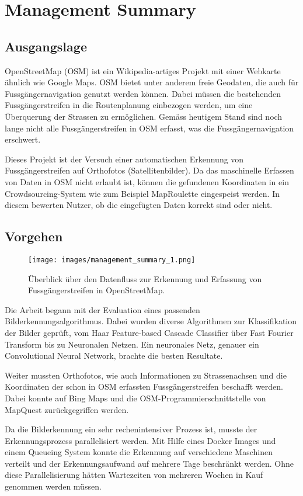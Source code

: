 \section{Management Summary}
\subsection*{Ausgangslage}
OpenStreetMap (OSM) ist ein Wikipedia-artiges Projekt mit einer Webkarte ähnlich wie Google Maps. OSM bietet unter anderem freie Geodaten, die auch für Fussgängernavigation genutzt werden können. Dabei müssen die bestehenden Fussgängerstreifen in die Routenplanung einbezogen werden, um eine Überquerung der Strassen zu ermöglichen. Gemäss heutigem Stand sind noch lange nicht alle Fussgängerstreifen in OSM erfasst, was die Fussgängernavigation erschwert.

Dieses Projekt ist der Versuch einer automatischen Erkennung von Fussgängerstreifen auf Orthofotos (Satellitenbilder). Da das maschinelle Erfassen von Daten in OSM nicht erlaubt ist, können die gefundenen Koordinaten in ein Crowdsourcing-System wie zum Beispiel MapRoulette eingespeist werden. In diesem bewerten Nutzer, ob die eingefügten Daten korrekt sind oder nicht.

\subsection*{Vorgehen}
\begin{figure}[H]
	\centering
	\texttt{[image: images/management\_summary\_1.png]}
	\caption[Management Summery Überblick]{Überblick über den Datenfluss zur Erkennung und Erfassung von Fussgängerstreifen in OpenStreetMap.}
\end{figure}
\medskip
Die Arbeit begann mit der Evaluation eines passenden Bilderkennungsalgorithmus. Dabei wurden diverse Algorithmen zur Klassifikation der Bilder geprüft, vom Haar Feature-based Cascade Classifier über Fast Fourier Transform bis zu Neuronalen Netzen. Ein neuronales Netz, genauer ein Convolutional Neural Network, brachte die besten Resultate.

Weiter mussten Orthofotos, wie auch Informationen zu Strassenachsen und die Koordinaten der schon in OSM erfassten Fussgängerstreifen beschafft werden. Dabei konnte auf Bing Maps und die OSM-Programmierschnittstelle von MapQuest zurückgegriffen werden.

Da die Bilderkennung ein sehr rechenintensiver Prozess ist, musste der Erkennungsprozess parallelisiert werden. Mit Hilfe eines Docker Images und einem Queueing System konnte die Erkennung auf verschiedene Maschinen verteilt und der Erkennungsaufwand auf mehrere Tage beschränkt werden. Ohne diese Parallelisierung hätten Wartezeiten von mehreren Wochen in Kauf genommen werden müssen.


